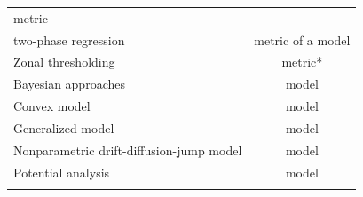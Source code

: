 \documentclass[12pt,twoside,openany]{reedthesis}
\begin{document}
\begin{longtable}[]{@{}lc@{}}
\begin{minipage}[t]{0.34\columnwidth}
metric\strut
\end{minipage}\tabularnewline
\begin{minipage}[t]{0.31\columnwidth}\raggedright\strut
two-phase regression\strut
\end{minipage} & \begin{minipage}[t]{0.34\columnwidth}\centering\strut
metric of a model\strut
\end{minipage}\tabularnewline
\begin{minipage}[t]{0.31\columnwidth}\raggedright\strut
Zonal thresholding\strut
\end{minipage} & \begin{minipage}[t]{0.34\columnwidth}\centering\strut
metric*\strut
\end{minipage}\tabularnewline
\begin{minipage}[t]{0.31\columnwidth}\raggedright\strut
Bayesian approaches\strut
\end{minipage} & \begin{minipage}[t]{0.34\columnwidth}\centering\strut
model\strut
\end{minipage}\tabularnewline
\begin{minipage}[t]{0.31\columnwidth}\raggedright\strut
Convex model\strut
\end{minipage} & \begin{minipage}[t]{0.34\columnwidth}\centering\strut
model\strut
\end{minipage}\tabularnewline
\begin{minipage}[t]{0.31\columnwidth}\raggedright\strut
Generalized model\strut
\end{minipage} & \begin{minipage}[t]{0.34\columnwidth}\centering\strut
model\strut
\end{minipage}\tabularnewline
\begin{minipage}[t]{0.31\columnwidth}\raggedright\strut
Nonparametric drift-diffusion-jump model\strut
\end{minipage} & \begin{minipage}[t]{0.34\columnwidth}\centering\strut
model\strut
\end{minipage}\tabularnewline
\begin{minipage}[t]{0.31\columnwidth}\raggedright\strut
Potential analysis\strut
\end{minipage} & \begin{minipage}[t]{0.34\columnwidth}\centering\strut
model\strut
\end{minipage}\tabularnewline
\begin{minipage}[t]{0.31\columnwidth}\raggedright\strut

\end{minipage}
\end{longtable}
\end{document}
